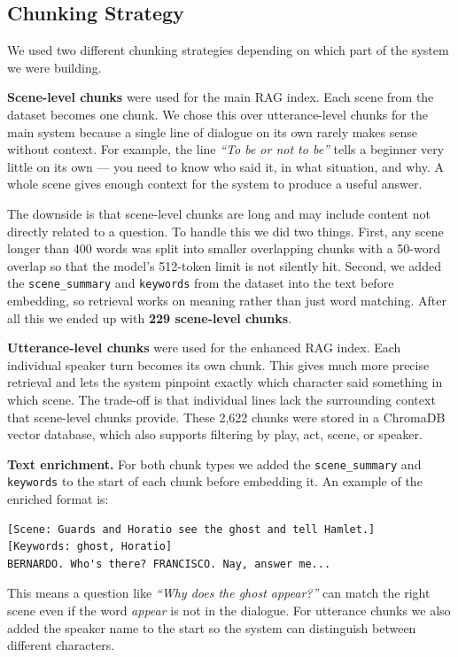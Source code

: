 \documentclass[10pt,conference]{IEEEtran}
\begin{document}
\subsection{Chunking Strategy}

We used two different chunking strategies depending on which part of
the system we were building.

\textbf{Scene-level chunks} were used for the main RAG index. Each
scene from the dataset becomes one chunk. We chose this over
utterance-level chunks for the main system because a single line of
dialogue on its own rarely makes sense without context. For example,
the line \textit{``To be or not to be''} tells a beginner very little
on its own --- you need to know who said it, in what situation, and
why. A whole scene gives enough context for the system to produce a
useful answer.

The downside is that scene-level chunks are long and may include
content not directly related to a question. To handle this we did two
things. First, any scene longer than 400 words was split into smaller
overlapping chunks with a 50-word overlap so that the model's
512-token limit is not silently hit. Second, we added the
\texttt{scene\_summary} and \texttt{keywords} from the dataset into
the text before embedding, so retrieval works on meaning rather than
just word matching. After all this we ended up with
\textbf{229 scene-level chunks}.

\textbf{Utterance-level chunks} were used for the enhanced RAG index.
Each individual speaker turn becomes its own chunk. This gives much
more precise retrieval and lets the system pinpoint exactly which
character said something in which scene. The trade-off is that
individual lines lack the surrounding context that scene-level chunks
provide. These 2,622 chunks were stored in a ChromaDB vector database,
which also supports filtering by play, act, scene, or speaker.

\textbf{Text enrichment.} For both chunk types we added the
\texttt{scene\_summary} and \texttt{keywords} to the start of each
chunk before embedding it. An example of the enriched format is:

\begin{lstlisting}
[Scene: Guards and Horatio see the ghost and tell Hamlet.]
[Keywords: ghost, Horatio]
BERNARDO. Who's there? FRANCISCO. Nay, answer me...
\end{lstlisting}

This means a question like \textit{``Why does the ghost appear?''} can
match the right scene even if the word \textit{appear} is not in the
dialogue. For utterance chunks we also added the speaker name to the
start so the system can distinguish between different characters.
\end{document}
